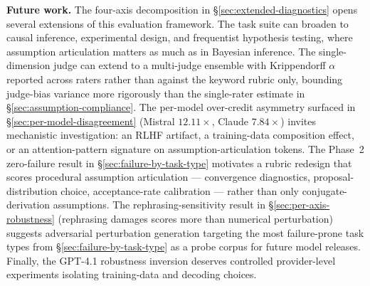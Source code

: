 \textbf{Future work.} The four-axis decomposition in
\S\ref{sec:extended-diagnostics} opens several extensions of this
evaluation framework. The task suite can broaden to causal
inference, experimental design, and frequentist hypothesis testing,
where assumption articulation matters as much as in Bayesian
inference. The single-dimension judge can extend to a multi-judge
ensemble with Krippendorff $\alpha$ reported across raters rather
than against the keyword rubric only, bounding judge-bias variance
more rigorously than the single-rater estimate in
\S\ref{sec:assumption-compliance}. The per-model over-credit
asymmetry surfaced in \S\ref{sec:per-model-disagreement}
(Mistral $12.11\times$, Claude $7.84\times$) invites mechanistic
investigation: an RLHF artifact, a training-data composition
effect, or an attention-pattern signature on
assumption-articulation tokens. The Phase~2 zero-failure result
in \S\ref{sec:failure-by-task-type} motivates a rubric redesign
that scores procedural assumption articulation --- convergence
diagnostics, proposal-distribution choice, acceptance-rate
calibration --- rather than only conjugate-derivation assumptions.
The rephrasing-sensitivity result in
\S\ref{sec:per-axis-robustness} (rephrasing damages scores more
than numerical perturbation) suggests adversarial perturbation
generation targeting the most failure-prone task types from
\S\ref{sec:failure-by-task-type} as a probe corpus for future
model releases. Finally, the GPT-4.1 robustness inversion
deserves controlled provider-level experiments isolating
training-data and decoding choices.
